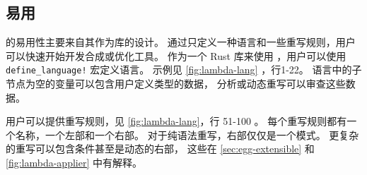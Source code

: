 \subsection{易用}
\label{sec:egg-easy}



\egg 的易用性主要来自其作为库的设计。
通过只定义一种语言和一些重写规则，用户可以快速开始开发合成或优化工具。
作为一个 Rust 库来使用 \egg ，用户可以使用 \texttt{define\_language!} 宏定义语言。
  示例见 \autoref{fig:lambda-lang} ，行1-22。
语言中的子节点为空的变量可以包含用户定义类型的数据，
  \eclass 分析或动态重写可以审查这些数据。 %


用户可以提供重写规则，见 \autoref{fig:lambda-lang}，行 51-100 。
每个重写规则都有一个名称，一个左部和一个右部。
对于纯语法重写，右部仅仅是一个模式。
更复杂的重写可以包含条件甚至是动态的右部，
  这些在 \autoref{sec:egg-extensible} 和 \autoref{fig:lambda-applier} 中有解释。

